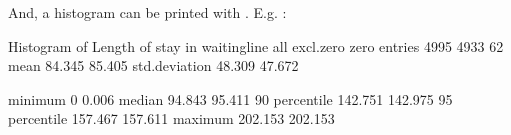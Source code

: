 \documentclass[letterpaper,10pt,english]{sphinxmanual}
\begin{document}
And, a histogram can be printed with . E.g.
:

%
\begin{sphinxVerbatim}[commandchars=\\\{\}]
Histogram of Length of stay in waitingline
                        all    excl.zero         zero
\PYGZhy{}\PYGZhy{}\PYGZhy{}\PYGZhy{}\PYGZhy{}\PYGZhy{}\PYGZhy{}\PYGZhy{}\PYGZhy{}\PYGZhy{}\PYGZhy{}\PYGZhy{}\PYGZhy{}\PYGZhy{} \PYGZhy{}\PYGZhy{}\PYGZhy{}\PYGZhy{}\PYGZhy{}\PYGZhy{}\PYGZhy{}\PYGZhy{}\PYGZhy{}\PYGZhy{}\PYGZhy{}\PYGZhy{} \PYGZhy{}\PYGZhy{}\PYGZhy{}\PYGZhy{}\PYGZhy{}\PYGZhy{}\PYGZhy{}\PYGZhy{}\PYGZhy{}\PYGZhy{}\PYGZhy{}\PYGZhy{} \PYGZhy{}\PYGZhy{}\PYGZhy{}\PYGZhy{}\PYGZhy{}\PYGZhy{}\PYGZhy{}\PYGZhy{}\PYGZhy{}\PYGZhy{}\PYGZhy{}\PYGZhy{}
entries            4995         4933           62
mean                 84.345       85.405
std.deviation        48.309       47.672

minimum               0            0.006
median               94.843       95.411
90\PYGZpc{} percentile      142.751      142.975
95\PYGZpc{} percentile      157.467      157.611
maximum             202.153      202.153


\end{sphinxVerbatim}
\end{document}
